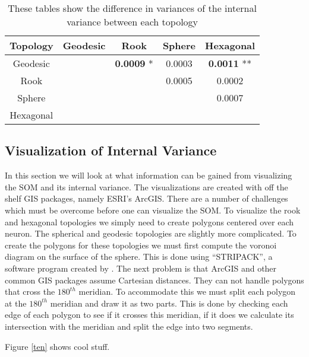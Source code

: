 \begin{table}[hbt]
  \centering
  \caption{These tables show the difference in variances of the internal variance between each topology}
  \label{rlt:allV}
  \begin{tabular}{|c||c|c|c|c|}
  \hline
  \textbf{Topology}&Geodesic &Rook	&Sphere			&Hexagonal		\\\hline
  \hline
  Geodesic	&& \textbf{0.0009} *	& 0.0003		& \textbf{0.0011} **	\\\hline
  Rook		&& 			& 0.0005		& 0.0002		\\\hline
  Sphere	&& 			& 			& 0.0007 		\\\hline
  Hexagonal 	&& 			& 			&			\\\hline
  \end{tabular}
  \end{table}



\subsection{Visualization of Internal Variance}
In this section we will look at what information can be gained from
visualizing the SOM and its internal variance. The visualizations are created
with off the shelf GIS packages, namely ESRI's ArcGIS.  There are a number of
challenges which must be overcome before one can visualize the SOM.  To
visualize the rook and hexagonal topologies we simply need to create polygons
centered over each neuron.  The spherical and geodesic topologies are slightly
more complicated.  To create the polygons for these topologies we must first
compute the voronoi diagram on the surface of the sphere.  This is done using
``STRIPACK'', a software program created by \cite{Ranka97}.  The next problem
is that ArcGIS and other common GIS packages assume Cartesian distances.  They
can not handle polygons that cross the $180^{th}$ meridian.  To accommodate this we
must split each polygon at the $180^{th}$ meridian and draw it as two parts.  This
is done by checking each edge of each polygon to see if it crosses this
meridian, if it does we calculate its intersection with the meridian and split
the edge into two segments.

        Figure \ref{ten} shows cool stuff.






